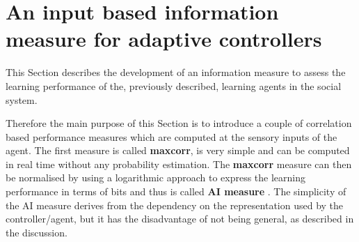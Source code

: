 \section{An input based information measure for adaptive controllers \label{Chapter5:Max Corr Input}}

This Section describes the development of an information measure
to assess the learning performance of the, previously described, learning agents
in the social system.

Therefore the main purpose of this Section is to introduce a couple of correlation 
based performance measures which are computed at the sensory inputs of the agent.
The first measure is called \textbf{maxcorr}, is very simple and
can be computed in real time without any probability estimation.
The \textbf{maxcorr} measure can then be normalised by using a logarithmic approach
to express the learning performance in terms of bits and thus is called \textbf{AI measure} .
The simplicity of the AI measure derives from the dependency on the
representation used by the controller/agent, but it has the disadvantage of
not being general, as described in the discussion.

